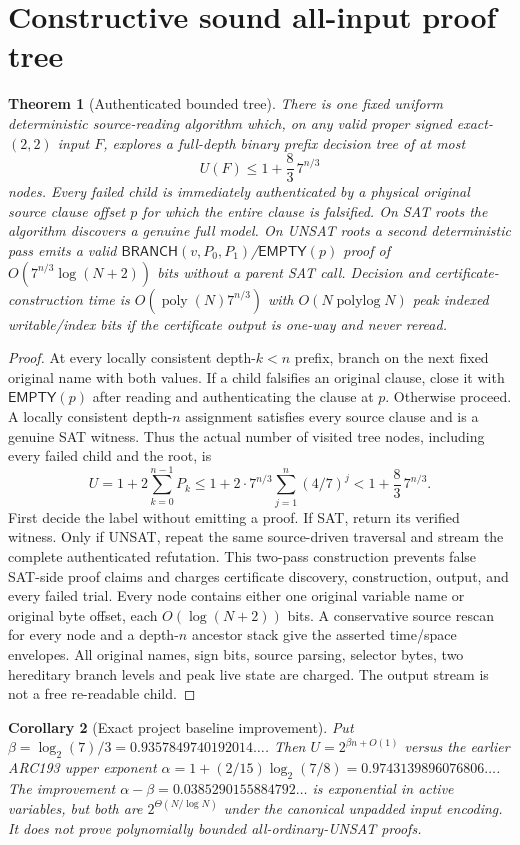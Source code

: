 \documentclass[11pt]{article}
\newtheorem{theorem}{Theorem}
\newtheorem{corollary}[theorem]{Corollary}
\begin{document}
\section{Constructive sound all-input proof tree}
\begin{theorem}[Authenticated bounded tree]\label{t:tree}
There is one fixed uniform deterministic source-reading algorithm
which, on any valid proper signed exact-$(2,2)$ input $F$, explores
a full-depth binary prefix decision tree of at most
\[
\boxed{U(F)\le 1+\frac83\,7^{n/3}} \tag{2}
\]
nodes. Every failed child is immediately authenticated by a physical
original source clause offset $p$ for which the entire clause is
falsified. On SAT roots the algorithm discovers a genuine full model.
On UNSAT roots a second deterministic pass emits a valid
$\mathsf{BRANCH}(v,P_0,P_1)$/$\mathsf{EMPTY}(p)$ proof of
$O(7^{n/3}\log(N+2))$ bits without a parent SAT call.
Decision and certificate-construction time is
$O(\operatorname{poly}(N)7^{n/3})$ with
$O(N\operatorname{polylog}N)$ peak indexed writable/index bits if the
certificate output is one-way and never reread.
\end{theorem}
\begin{proof}
At every locally consistent depth-$k<n$ prefix, branch on the next
fixed original name with both values. If a child falsifies an original
clause, close it with $\mathsf{EMPTY}(p)$ after reading and authenticating
the clause at $p$. Otherwise proceed. A locally consistent depth-$n$
assignment satisfies every source clause and is a genuine SAT witness.
Thus the actual number of visited tree nodes, including every failed
child and the root, is
\[
U=1+2\sum_{k=0}^{n-1}P_k
\le1+2\cdot7^{n/3}\sum_{j=1}^n(4/7)^j
<1+\frac83\,7^{n/3}.
\]
First decide the label without emitting a proof. If SAT, return its
verified witness. Only if UNSAT, repeat the same source-driven traversal
and stream the complete authenticated refutation. This two-pass
construction prevents false SAT-side proof claims and charges
certificate discovery, construction, output, and every failed trial.
Every node contains either one original variable name or original byte
offset, each $O(\log(N+2))$ bits. A conservative source rescan for
every node and a depth-$n$ ancestor stack give the asserted
time/space envelopes. All original names, sign bits, source parsing,
selector bytes, two hereditary branch levels and peak live state
are charged. The output stream is not a free re-readable child.
\end{proof}

\begin{corollary}[Exact project baseline improvement]
Put $\beta=\log_2(7)/3=0.9357849740192014\ldots$.
Then $U=2^{\beta n+O(1)}$ versus the earlier
ARC193 upper exponent
$\alpha=1+(2/15)\log_2(7/8)=0.9743139896076806\ldots$.
The improvement $\alpha-\beta=0.0385290155884792\ldots$
is exponential in active variables, but both are
$2^{\Theta(N/\log N)}$ under the canonical unpadded input encoding.
It does not prove polynomially bounded all-ordinary-UNSAT proofs.
\end{corollary}
\end{document}
